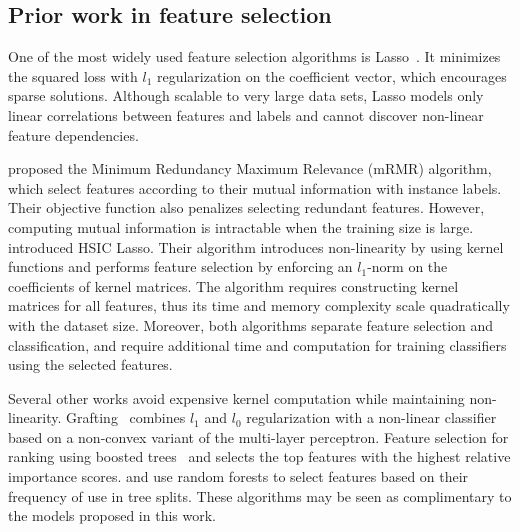 \subsection{Prior work in feature selection}
One of the most widely used feature selection algorithms is Lasso~\citep{tibshirani1996regression}. It minimizes the squared loss with $l_1$ regularization on the coefficient vector, which encourages sparse solutions.  Although scalable to very large data sets, Lasso models only linear correlations between features and labels and cannot discover non-linear feature dependencies. 

\citet{peng2005feature} proposed the Minimum Redundancy Maximum Relevance (mRMR) algorithm, which select features according to their mutual information with instance labels. Their objective function also penalizes selecting redundant features. However, computing mutual information is intractable when the training size is large. \citet{yamada2012high} introduced HSIC Lasso. Their algorithm introduces non-linearity by using kernel functions and performs feature selection by enforcing an $l_1$-norm on the coefficients of kernel matrices. The algorithm requires constructing kernel matrices for all features, thus its time and memory complexity scale quadratically with the dataset size. Moreover, both algorithms separate feature selection and classification, and require additional time and computation for training classifiers using the selected features.

Several other works avoid expensive kernel computation while maintaining non-linearity.  Grafting~\citep{perkins2003grafting} combines $l_1$ and $l_0$ regularization with a non-linear classifier based on a non-convex variant of the multi-layer perceptron. Feature selection for ranking using boosted trees~\citep{pan2009feature} and selects the top features with the highest relative importance scores. \cite{tuv2009feature} and \cite{trevor2009elements} use random forests to select features based on their frequency of use in tree splits. These algorithms may be seen as complimentary to the models proposed in this work. 
